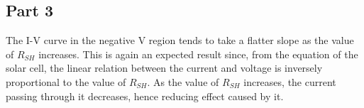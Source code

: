 \documentclass[12pt]{article}
\begin{document}
\subsection{Part 3}

The I-V curve in the negative V region tends to take a flatter slope as the value of \( R_{SH} \) increases. This is again an expected result since, from the equation of the solar cell, the linear relation between the current and voltage is inversely proportional to the value of \( R_{SH} \). As the value of \( R_{SH} \) increases, the current passing through it decreases, hence reducing effect caused by it.
\end{document}
